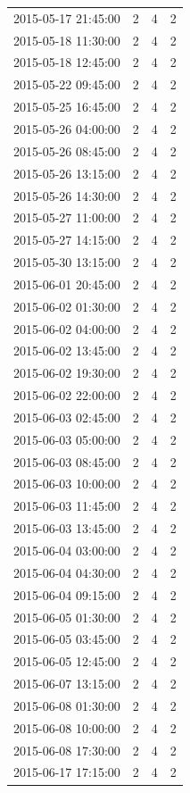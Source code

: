 \begin{tabular}{lrrr}
2015-05-17 21:45:00 & 2 & 4 & 2 \\
2015-05-18 11:30:00 & 2 & 4 & 2 \\
2015-05-18 12:45:00 & 2 & 4 & 2 \\
2015-05-22 09:45:00 & 2 & 4 & 2 \\
2015-05-25 16:45:00 & 2 & 4 & 2 \\
2015-05-26 04:00:00 & 2 & 4 & 2 \\
2015-05-26 08:45:00 & 2 & 4 & 2 \\
2015-05-26 13:15:00 & 2 & 4 & 2 \\
2015-05-26 14:30:00 & 2 & 4 & 2 \\
2015-05-27 11:00:00 & 2 & 4 & 2 \\
2015-05-27 14:15:00 & 2 & 4 & 2 \\
2015-05-30 13:15:00 & 2 & 4 & 2 \\
2015-06-01 20:45:00 & 2 & 4 & 2 \\
2015-06-02 01:30:00 & 2 & 4 & 2 \\
2015-06-02 04:00:00 & 2 & 4 & 2 \\
2015-06-02 13:45:00 & 2 & 4 & 2 \\
2015-06-02 19:30:00 & 2 & 4 & 2 \\
2015-06-02 22:00:00 & 2 & 4 & 2 \\
2015-06-03 02:45:00 & 2 & 4 & 2 \\
2015-06-03 05:00:00 & 2 & 4 & 2 \\
2015-06-03 08:45:00 & 2 & 4 & 2 \\
2015-06-03 10:00:00 & 2 & 4 & 2 \\
2015-06-03 11:45:00 & 2 & 4 & 2 \\
2015-06-03 13:45:00 & 2 & 4 & 2 \\
2015-06-04 03:00:00 & 2 & 4 & 2 \\
2015-06-04 04:30:00 & 2 & 4 & 2 \\
2015-06-04 09:15:00 & 2 & 4 & 2 \\
2015-06-05 01:30:00 & 2 & 4 & 2 \\
2015-06-05 03:45:00 & 2 & 4 & 2 \\
2015-06-05 12:45:00 & 2 & 4 & 2 \\
2015-06-07 13:15:00 & 2 & 4 & 2 \\
2015-06-08 01:30:00 & 2 & 4 & 2 \\
2015-06-08 10:00:00 & 2 & 4 & 2 \\
2015-06-08 17:30:00 & 2 & 4 & 2 \\
2015-06-17 17:15:00 & 2 & 4 & 2 \\

\end{tabular}
